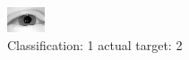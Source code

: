 \begin{figure}[h!]
\begin{center}
\includegraphics[width=0.60\columnwidth]{figures/ID2362_class_1_target_2.png}
\end{center}
\caption{ Classification: 1 actual target: 2}
\label{fig:ID2362_class_1_target_2}
\end{figure}
